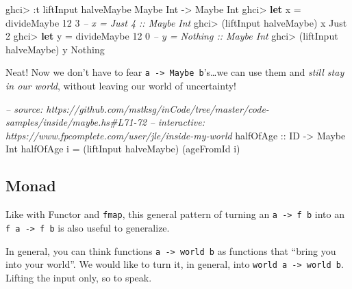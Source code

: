 \documentclass[]{article}
\newenvironment{Shaded}{\begin{snugshade}}{\end{snugshade}}
\newcommand{\CommentTok}[1]{\textcolor[rgb]{0.56,0.35,0.01}{\textit{#1}}}
\newcommand{\DataTypeTok}[1]{\textcolor[rgb]{0.13,0.29,0.53}{#1}}
\newcommand{\DecValTok}[1]{\textcolor[rgb]{0.00,0.00,0.81}{#1}}
\newcommand{\FunctionTok}[1]{\textcolor[rgb]{0.00,0.00,0.00}{#1}}
\newcommand{\KeywordTok}[1]{\textcolor[rgb]{0.13,0.29,0.53}{\textbf{#1}}}
\newcommand{\NormalTok}[1]{#1}
\newcommand{\OtherTok}[1]{\textcolor[rgb]{0.56,0.35,0.01}{#1}}
\begin{document}
\begin{Shaded}
\begin{Highlighting}[]
\NormalTok{ghci}\FunctionTok{>} \FunctionTok{:}\NormalTok{t liftInput halveMaybe}
\DataTypeTok{Maybe} \DataTypeTok{Int} \OtherTok{->} \DataTypeTok{Maybe} \DataTypeTok{Int}
\NormalTok{ghci}\FunctionTok{>} \KeywordTok{let}\NormalTok{ x }\FunctionTok{=}\NormalTok{ divideMaybe }\DecValTok{12} \DecValTok{3}     \CommentTok{-- x = Just 4 :: Maybe Int}
\NormalTok{ghci}\FunctionTok{>}\NormalTok{ (liftInput halveMaybe) x}
\DataTypeTok{Just} \DecValTok{2}
\NormalTok{ghci}\FunctionTok{>} \KeywordTok{let}\NormalTok{ y }\FunctionTok{=}\NormalTok{ divideMaybe }\DecValTok{12} \DecValTok{0}     \CommentTok{-- y = Nothing :: Maybe Int}
\NormalTok{ghci}\FunctionTok{>}\NormalTok{ (liftInput halveMaybe) y}
\DataTypeTok{Nothing}
\end{Highlighting}
\end{Shaded}

Neat! Now we don't have to fear
\texttt{a\ -\textgreater{}\ Maybe\ b}'s\ldots{}we can use them and \emph{still
stay in our world}, without leaving our world of uncertainty!

\begin{Shaded}
\begin{Highlighting}[]
\CommentTok{-- source: https://github.com/mstksg/inCode/tree/master/code-samples/inside/maybe.hs#L71-72}
\CommentTok{-- interactive: https://www.fpcomplete.com/user/jle/inside-my-world}
\OtherTok{halfOfAge ::} \DataTypeTok{ID} \OtherTok{->} \DataTypeTok{Maybe} \DataTypeTok{Int}
\NormalTok{halfOfAge i }\FunctionTok{=}\NormalTok{ (liftInput halveMaybe) (ageFromId i)}
\end{Highlighting}
\end{Shaded}

\hypertarget{monad}{%
\subsection{Monad}\label{monad}}

Like with Functor and \texttt{fmap}, this general pattern of turning an
\texttt{a\ -\textgreater{}\ f\ b} into an \texttt{f\ a\ -\textgreater{}\ f\ b}
is also useful to generalize.

In general, you can think functions \texttt{a\ -\textgreater{}\ world\ b} as
functions that ``bring you into your world''. We would like to turn it, in
general, into \texttt{world\ a\ -\textgreater{}\ world\ b}. Lifting the input
only, so to speak.
\end{document}
